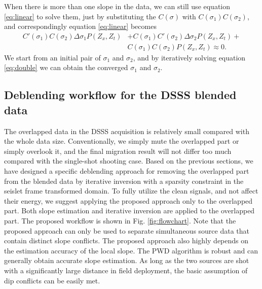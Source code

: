 When there is more than one slope in the data, we can still use equation \ref{eq:linear} to solve them, just by substituting the $C(\sigma)$ with $C(\sigma_1)C(\sigma_2)$,
and correspondingly equation \ref{eq:linear} becomes
\begin{equation}
\label{eq:double}
\begin{split}
C'(\sigma_1)C(\sigma_2)\Delta\sigma_1P(Z_x,Z_t)  &+C(\sigma_1)C'(\sigma_2)\Delta\sigma_2P(Z_x,Z_t)  + \\
&C(\sigma_1)C(\sigma_2)P(Z_x,Z_t) \approx 0.
\end{split}
\end{equation}
We start from an initial pair of $\sigma_1$ and $\sigma_2$, and by iteratively solving equation \ref{eq:double} we can obtain the converged $\sigma_1$ and $\sigma_2$.

\subsection{Deblending workflow for the DSSS blended data}
The overlapped data in the DSSS acquisition is relatively small compared with the whole data size. Conventionally, we simply mute the overlapped part or simply overlook it, and the final migration result will not differ too much compared with the single-shot shooting case. Based on the previous sections, we have designed a specific deblending approach for removing the overlapped part from the blended data by iterative inversion with a sparsity constraint in the seislet frame transformed domain. To fully utilize the clean signals, and not affect their energy, we suggest applying the proposed approach only to the overlapped part. Both slope estimation and iterative inversion are applied to the overlapped part. The proposed workflow is shown in Fig. \ref{fig:flowchart}.  Note that the proposed approach can only be used to separate simultaneous source data that contain distinct slope conflicts. The proposed approach also highly depends on the estimation accuracy of the local slope. The PWD algorithm is robust and can generally obtain accurate slope estimation. As long as the two sources are shot with a significantly large distance in field deployment, the basic assumption of dip conflicts can be easily met.

